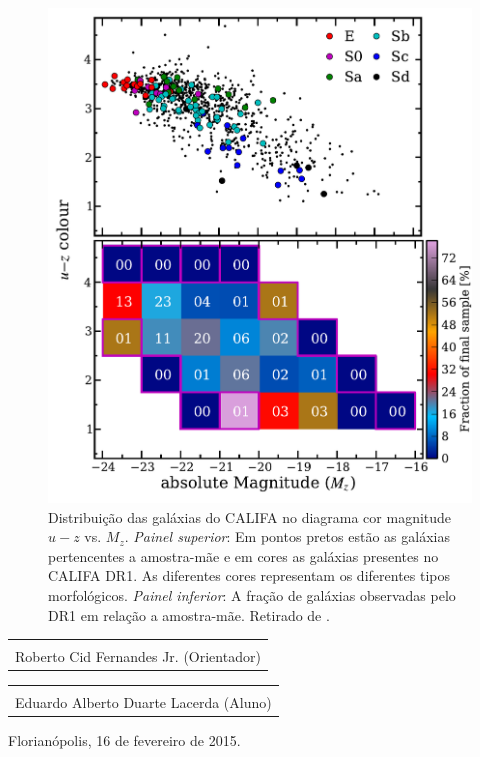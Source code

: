 \documentclass[a4paper,12pt]{article}
\makeatletter
\newcommand{\signature}[2][2.5in]{%
  \noindent%
  \begin{center}
  \begin{tabular}{@{}p{#1}@{}}
    \\ \hline \\ [-.75\normalbaselineskip]
    #2
  \end{tabular} 
  \end{center}
}
\makeatother
\begin{document}
\begin{figure}
	\begin{center}
    \includegraphics[height=0.5\textwidth]{figuras/figHusemann2013Fig2.pdf}
    \caption[Diagrama cor-magnitude para as galáxias do CALIFA.]
    {Distribui\c{c}\~ao das galáxias do CALIFA no diagrama cor magnitude $u-z$ vs. $M_z$. {\em
    Painel superior}: Em pontos pretos est\~ao as galáxias pertencentes a amostra-m\~ae e em cores
    as galáxias presentes no CALIFA DR1. As diferentes cores representam os diferentes tipos
    morfológicos. {\em Painel inferior}: A fra\c{c}\~ao de galáxias observadas pelo DR1 em
    rela\c{c}\~ao a amostra-m\~ae. Retirado de \citet{Husemann.etal.2013a}.}
    \label{fig:cm-uzMz}
    \end{center}
\end{figure}




\newpage

\vspace*{8cm}

\signature[4in]{Roberto Cid Fernandes Jr. (Orientador)}

\vspace{4cm}

\signature[4in]{Eduardo Alberto Duarte Lacerda (Aluno)}

\vspace{6cm}

\begin{center}
Florianópolis, 16 de fevereiro de 2015.
\end{center}
\end{document}
